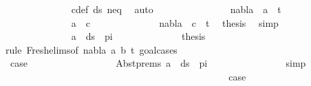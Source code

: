 \begin{isabellebody}
\ \ \ \ \ \ \ \ \ \ \ \ \isamarkupfalse%
\ c{\isacharunderscore}{\kern0pt}def\ ds{\isacharunderscore}{\kern0pt}{}\ neq\ \isamarkupfalse%
\ auto\ \ \isanewline
\ \ \ \ \ \ \ \ \ \ \isamarkupfalse%
\ \isamarkupfalse%
\ {\isachardoublequoteopen}nabla\ {\isasymturnstile}\ a\ {\isasymsharp}\ t{\isacharprime}{\kern0pt}{\isachardoublequoteclose}\isanewline
\ \ \ \ \ \ \ \ \ \ \isamarkupfalse%
\isanewline
\ \ \ \ \ \ \ \ \ \ \ \ \isamarkupfalse%
\ {\isachardoublequoteopen}a\ {\isacharequal}{\kern0pt}\ c{\isachardoublequoteclose}\isanewline
\ \ \ \ \ \ \ \ \ \ \ \ \isamarkupfalse%
\ {\isacartoucheopen}nabla\ {\isasymturnstile}\ c\ {\isasymsharp}\ t{\isacharprime}{\kern0pt}{\isacartoucheclose}\ \isamarkupfalse%
\ {\isacharquery}{\kern0pt}thesis\ \isamarkupfalse%
\ simp\isanewline
\ \ \ \ \ \ \ \ \ \ \isamarkupfalse%
\isanewline
\ \ \ \ \ \ \ \ \ \ \ \ \isamarkupfalse%
\ {\isachardoublequoteopen}a\ {\isasymin}\ ds\ {\isacharbrackleft}{\kern0pt}{\isacharbrackright}{\kern0pt}\ pi{\isachardoublequoteclose}\isanewline
\ \ \ \ \ \ \ \ \ \ \ \ \isamarkupfalse%
\ {\isacharquery}{\kern0pt}thesis\ \isanewline
\ \ \ \ \ \ \ \ \ \ \ \ \isamarkupfalse%
{\isacharparenleft}{\kern0pt}rule\ Fresh{\isacharunderscore}{\kern0pt}elims{\isacharparenleft}{\kern0pt}{}{\isacharparenright}{\kern0pt}{\isacharbrackleft}{\kern0pt}of\ nabla\ a\ b\ t{\isacharprime}{\kern0pt}{\isacharbrackright}{\kern0pt}{\isacharcomma}{\kern0pt}\ goal{\isacharunderscore}{\kern0pt}cases{\isacharparenright}{\kern0pt}\isanewline
\ \ \ \ \ \ \ \ \ \ \ \ \ \ \isamarkupfalse%
\ {}\isanewline
\ \ \ \ \ \ \ \ \ \ \ \ \ \ \isamarkupfalse%
\ \isamarkupfalse%
\ {\isacharquery}{\kern0pt}case\isanewline
\ \ \ \ \ \ \ \ \ \ \ \ \ \ \ \ \isamarkupfalse%
\ Abst{\isachardot}{\kern0pt}prems\ {\isacartoucheopen}a\ {\isasymin}\ ds\ {\isacharbrackleft}{\kern0pt}{\isacharbrackright}{\kern0pt}\ pi{\isacartoucheclose}\isanewline
\ \ \ \ \ \ \ \ \ \ \ \ \ \ \isamarkupfalse%
\ simp\isanewline
\ \ \ \ \ \ \ \ \ \ \ \ \isamarkupfalse%
\isanewline
\ \ \ \ \ \ \ \ \ \ \ \ \ \ \isamarkupfalse%
\ {}\isanewline
\ \ \ \ \ \ \ \ \ \ \ \ \ \ \isamarkupfalse%
\ \isamarkupfalse%
\ {\isacharquery}{\kern0pt}case\ \isamarkupfalse%

\end{isabellebody}

